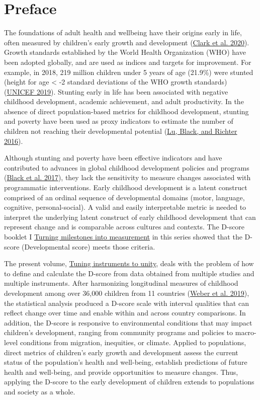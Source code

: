 \documentclass[
]{book}
\begin{document}
\hypertarget{preface}{%
\chapter*{Preface}\label{preface}}

The foundations of adult health and wellbeing have their origins early in life, often measured by children's early growth and development (\protect\hyperlink{ref-clark2020}{Clark et al. 2020}). Growth standards established by the World Health Organization (WHO) have been adopted globally, and are used as indices and targets for improvement. For example, in 2018, 219 million children under 5 years of age (21.9\%) were stunted (height for age \textless{} -2 standard deviations of the WHO growth standards) (\protect\hyperlink{ref-unicef2019}{UNICEF 2019}). Stunting early in life has been associated with negative childhood development, academic achievement, and adult productivity. In the absence of direct population-based metrics for childhood development, stunting and poverty have been used as proxy indicators to estimate the number of children not reaching their developmental potential (\protect\hyperlink{ref-lu2016}{Lu, Black, and Richter 2016}).

Although stunting and poverty have been effective indicators and have contributed to advances in global childhood development policies and programs (\protect\hyperlink{ref-black2017}{Black et al. 2017}), they lack the sensitivity to measure changes associated with programmatic interventions. Early childhood development is a latent construct comprised of an ordinal sequence of developmental domains (motor, language, cognitive, personal-social). A valid and easily interpretable metric is needed to interpret the underlying latent construct of early childhood development that can represent change and is comparable across cultures and contexts. The D-score booklet I \href{https://d-score.org/dbook1}{Turning milestones into measurement} in this series showed that the D-score (Developmental score) meets those criteria.

The present volume, \href{https://d-score.org/dbook2}{Tuning instruments to unity}, deals with the problem of how to define and calculate the D-score from data obtained from multiple studies and multiple instruments. After harmonizing longitudinal measures of childhood development among over 36,000 children from 11 countries (\protect\hyperlink{ref-Weber2019}{Weber et al. 2019}), the statistical analysis produced a D-score scale with interval qualities that can reflect change over time and enable within and across country comparisons. In addition, the D-score is responsive to environmental conditions that may impact children's development, ranging from community programs and policies to macro-level conditions from migration, inequities, or climate. Applied to populations, direct metrics of children's early growth and development assess the current status of the population's health and well-being, establish predictions of future health and well-being, and provide opportunities to measure changes. Thus, applying the D-score to the early development of children extends to populations and society as a whole.
\end{document}
